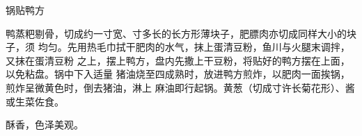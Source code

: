 \begin{recipe}{锅贴鸭方}

\ingredients


\preparation

鸭蒸粑剔骨，切成约一寸宽、寸多长的长方形薄块子，肥膘肉亦切成同样大小的块子，须
均匀。先用热毛巾拭干肥肉的水气，抹上蛋清豆粉，鱼川与火腿末调拌，又抹在蛋清豆粉
之上，摆上鸭方，盘内先撒上干豆粉，将贴好的鸭方摆在上面，以免粘盘。锅中下入适量
猪油烧至四成熟时，放进鸭方煎炸，以肥肉一面挨锅，煎炸呈微黄色时，倒去猪油，淋上
麻油即行起锅。黄葱（切成寸许长菊花形）、酱或生菜佐食。

\features

酥香，色泽美观。

\end{recipe}

